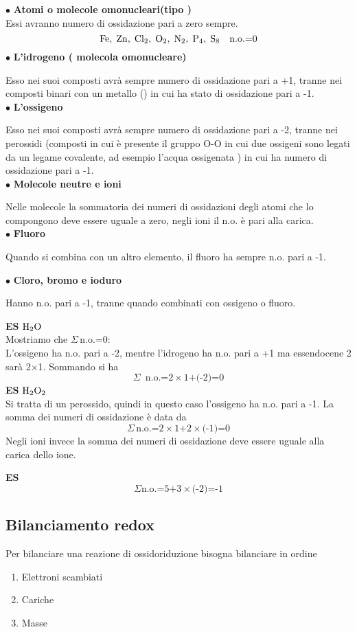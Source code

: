 $\bullet$ \textbf{Atomi o molecole omonucleari(tipo )}\\
Essi avranno numero di ossidazione pari a zero sempre.
$$\ce{Fe,\;Zn,\;Cl_2,\;O_2,\;N_2,\;P_4,\;S_8}\quad \text{n.o.=0}$$
$\bullet$  \textbf{L'idrogeno ( molecola omonucleare)}

Esso nei suoi composti avrà sempre numero di ossidazione pari a +1, tranne nei composti binari con un metallo () in cui ha stato di ossidazione pari a -1.\\
$\bullet$  \textbf{L'ossigeno}

Esso nei suoi composti avrà sempre numero di ossidazione pari a -2, tranne nei perossidi (composti in cui è presente il gruppo O-O in cui due ossigeni sono legati da un legame covalente, ad esempio l'acqua ossigenata ) in cui ha numero di ossidazione pari a -1.\\
$\bullet$  \textbf{Molecole neutre e ioni}

Nelle molecole la sommatoria dei numeri di ossidazioni degli atomi che lo compongono deve essere uguale a zero, negli ioni il n.o. è pari alla carica.\\
$\bullet$ \textbf{Fluoro}

Quando si combina con un altro elemento, il fluoro ha sempre n.o. pari a -1.

$\bullet$ \textbf{Cloro, bromo e ioduro}

Hanno n.o. pari a -1, tranne quando combinati con ossigeno o fluoro.

\textbf{ES} $\ce{H_2O}\qquad$\\
Mostriamo che $\Sigma\,$n.o.=0:\\
L'ossigeno ha n.o. pari a -2, mentre l'idrogeno ha n.o. pari a +1 ma essendocene 2 sarà 2$\times$1. Sommando si ha\\
$$\Sigma\,\text{ n.o.=2} \times \text{1+(-2)=0}$$
\textbf{ES} $\ce{H_2O_2}$\\
Si tratta di un perossido, quindi in questo caso l'ossigeno ha n.o. pari a -1. La somma dei numeri di ossidazione è data da\\
$$\Sigma\,\text{n.o.=2} \times \text{1+2} \times \text{(-1)=0}$$
Negli ioni invece la somma dei numeri di ossidazione deve essere uguale alla carica dello ione.

\textbf{ES} 
$$\Sigma \text{n.o.=5+3} \times \text{(-2)=-1}$$
\subsection{Bilanciamento redox}
Per bilanciare una reazione di ossidoriduzione bisogna bilanciare in ordine
\begin{enumerate}
    \item Elettroni scambiati
    \item Cariche
    \item Masse
  \end{enumerate}
